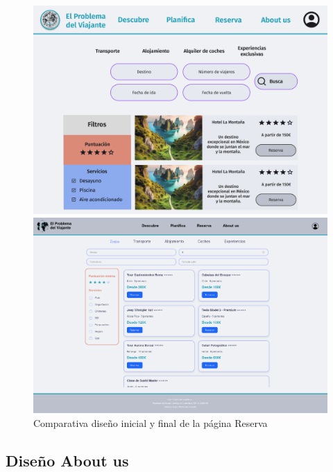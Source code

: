 \documentclass[11pt, a4paper]{book}
\begin{document}
	\begin{figure} [H]
		\centering
		\begin{minipage}[c]{0.45\textwidth}
			\centering
			\includegraphics[width=\textwidth]{mockup-reserva.png}
		\end{minipage}
		\hspace{0.04\textwidth}
		\begin{minipage}[c]{0.45\textwidth}
			\centering
			\includegraphics[width=\textwidth]{full-4.png}
		\end{minipage}
		\caption{Comparativa diseño inicial y final de la página Reserva}
	\end{figure}
	
	\subsection{Diseño About us}
	
\end{document}
